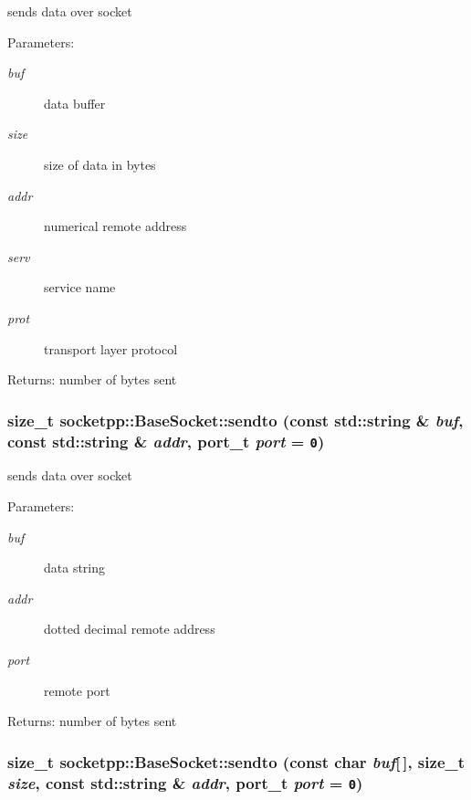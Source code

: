 sends data over socket 

\begin{Desc}
\item[Parameters:]
\begin{description}
\item[{\em buf}]data buffer \item[{\em size}]size of data in bytes \item[{\em addr}]numerical remote address \item[{\em serv}]service name \item[{\em prot}]transport layer protocol \end{description}
\end{Desc}
\begin{Desc}
\item[Returns:]number of bytes sent \end{Desc}
\hypertarget{classsocketpp_1_1BaseSocket_8f98eff253e52ccf3463a0379a10caf2}{
\subsubsection[{sendto}]{\setlength{\rightskip}{0pt plus 5cm}size\_\-t socketpp::BaseSocket::sendto (const std::string \& {\em buf}, \/  const std::string \& {\em addr}, \/  {\bf port\_\-t} {\em port} = {\tt 0})}}
\label{classsocketpp_1_1BaseSocket_8f98eff253e52ccf3463a0379a10caf2}


sends data over socket 

\begin{Desc}
\item[Parameters:]
\begin{description}
\item[{\em buf}]data string \item[{\em addr}]dotted decimal remote address \item[{\em port}]remote port \end{description}
\end{Desc}
\begin{Desc}
\item[Returns:]number of bytes sent \end{Desc}
\hypertarget{classsocketpp_1_1BaseSocket_2b591cefe9fd8ac9f46ed7fbdd8caa82}{
\subsubsection[{sendto}]{\setlength{\rightskip}{0pt plus 5cm}size\_\-t socketpp::BaseSocket::sendto (const char {\em buf}\mbox{[}$\,$\mbox{]}, \/  size\_\-t {\em size}, \/  const std::string \& {\em addr}, \/  {\bf port\_\-t} {\em port} = {\tt 0})}}
\label{classsocketpp_1_1BaseSocket_2b591cefe9fd8ac9f46ed7fbdd8caa82}


